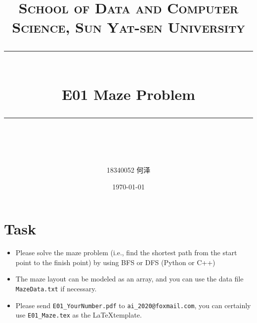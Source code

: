 \documentclass[a4paper, 11pt]{article}
\title{	
\normalfont \normalsize
\textsc{School of Data and Computer Science, Sun Yat-sen University} \\ [25pt] %
\rule{\textwidth}{0.5pt} \\[0.4cm] %
\huge  E01 Maze Problem\\ %
\rule{\textwidth}{2pt} \\[0.5cm] %
\author{18340052   何泽}
\date{\normalsize\today}
}
\begin{document}
\maketitle
\tableofcontents
\newpage
\section{Task}



\begin{itemize}
	\item Please solve the maze problem (i.e., find the shortest path from the start point to the finish point) by using BFS or DFS (Python or C++)
	\item The maze layout can be modeled as an array, and you can use the data file \texttt{MazeData.txt} if necessary.
	\item Please send \texttt{E01\_YourNumber.pdf} to \texttt{ai\_2020@foxmail.com}, you can certainly use \texttt{E01\_Maze.tex} as the \LaTeX template.
\end{itemize}
\end{document}
